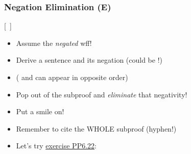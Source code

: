 \begin{frame}
  \begin{fitchproof}
    \open
     
    \open
     
    \open
     
    \close
    \close
    \close
  \end{fitchproof}
\end{frame}

\begin{frame}
  \frametitle{Negation Elimination (\enot E)}
  
\begin{multicols}{2}

\begin{center}
    \begin{fitchproof}
\open
	 \ellipsesline
	\metaB{}
	 \ellipsesline
\close
{}[\ ]\metaA{}
\end{fitchproof}
    \end{center}
   
   \columnbreak
    
\begin{center}

 \begin{itemize}[<+->]

\item Assume the \emph{negated} wff!

\item Derive a sentence and its negation (could be \metaA{}!)

\item (\metaB{} and \enot\metaB{} can appear in opposite order)

\item Pop out of the subproof and \emph{eliminate} that negativity! 

\item Put a smile on!

\item Remember to cite the WHOLE subproof (hyphen!)

\item Let's try \href{https://tinyurl.com/2p82rpv5}{exercise PP6.22}:

\end{itemize}
  \end{center}
\end{multicols}

\end{frame}


